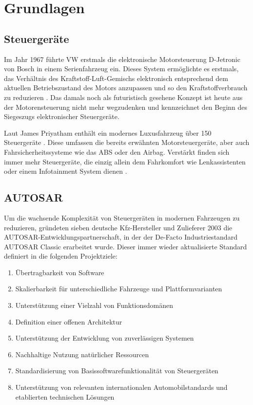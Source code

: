 \chapter{Grundlagen}\label{sec:grundlagen}

\section{Steuergeräte}\label{subsec:steuergeraete}

Im Jahr 1967 führte VW erstmals die elektronische Motorsteuerung D-Jetronic von Bosch in einem Serienfahrzeug ein. Dieses System ermöglichte es erstmals, das Verhältnis des Kraftstoff-Luft-Gemischs elektronisch entsprechend dem aktuellen Betriebszustand des Motors anzupassen und so den Kraftstoffverbrauch zu reduzieren \cite[S. 13]{schaeffer2013}. Das damals noch als futuristisch gesehene Konzept ist heute aus der Motorensteuerung nicht mehr wegzudenken und kennzeichnet den Beginn des Siegeszugs elektronischer Steuergeräte.

Laut James Priyatham enthält ein modernes Luxusfahrzeug über 150 Steuergeräte \cite[]{numberEcus}. Diese umfassen die bereits erwähnten Motorsteuergeräte, aber auch Fahrsicherheitssysteme wie das ABS oder den Airbag. Verstärkt finden sich immer mehr Steuergeräte, die einzig allein dem Fahrkomfort wie Lenkassistenten oder einem Infotainment System dienen \cite[S. 1]{Wolf2018}. 


\section{AUTOSAR}\label{subsec:autosarclassic}

Um die wachsende Komplexität von Steuergeräten in modernen Fahrzeugen zu reduzieren, gründeten sieben deutsche Kfz-Hersteller und Zulieferer 2003 die AUTOSAR-Entwicklungspartnerschaft, in der der De-Facto Industriestandard AUTOSAR Classic erarbeitet wurde. Dieser immer wieder aktualisierte Standard definiert in \cite{AUTOSAR2020} die folgenden Projektziele:
\begin{enumerate}
\item Übertragbarkeit von Software
\item Skalierbarkeit für unterschiedliche Fahrzeuge und Plattformvarianten
\item Unterstützung einer Vielzahl von Funktionsdomänen
\item Definition einer offenen Architektur
\item Unterstützung der Entwicklung von zuverlässigen Systemen
\item Nachhaltige Nutzung natürlicher Ressourcen
\item Standardisierung von Basissoftwarefunktionalität von Steuergeräten
\item Unterstützung von relevanten internationalen Automobilstandards und etablierten technischen Lösungen
\end{enumerate}

